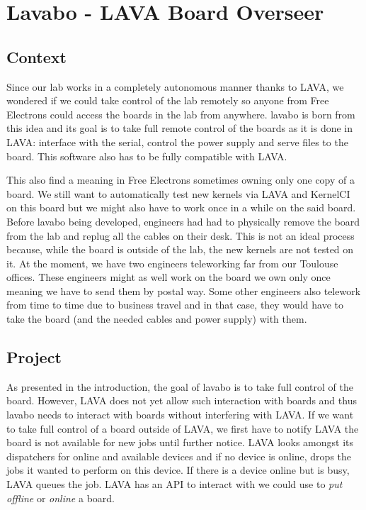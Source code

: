 \chapter{Lavabo - LAVA Board Overseer}
\section{Context}

Since our lab works in a completely autonomous manner thanks to LAVA, we wondered if we could take control of the lab remotely so anyone from Free Electrons could access the boards in the lab from anywhere. lavabo is born from this idea and its goal is to take full remote control of the boards as it is done in LAVA: interface with the serial, control the power supply and serve files to the board. This software also has to be fully compatible with LAVA.

This also find a meaning in Free Electrons sometimes owning only one copy of a board. We still want to automatically test new kernels via LAVA and KernelCI on this board but we might also have to work once in a while on the said board. Before lavabo being developed, engineers had had to physically remove the board from the lab and replug all the cables on their desk. This is not an ideal process because, while the board is outside of the lab, the new kernels are not tested on it. At the moment, we have two engineers teleworking far from our Toulouse offices. These engineers might as well work on the board we own only once meaning we have to send them by postal way. Some other engineers also telework from time to time due to business travel and in that case, they would have to take the board (and the needed cables and power supply) with them.

\section{Project}

As presented in the introduction, the goal of lavabo is to take full control of the board. However, LAVA does not yet allow such interaction with boards and thus lavabo needs to interact with boards without interfering with LAVA. If we want to take full control of a board outside of LAVA, we first have to notify LAVA the board is not available for new jobs until further notice. LAVA looks amongst its dispatchers for online and available devices and if no device is online, drops the jobs it wanted to perform on this device. If there is a device online but is busy, LAVA queues the job. LAVA has an API to interact with  we could use to \textit{put offline} or \textit{online} a board.

